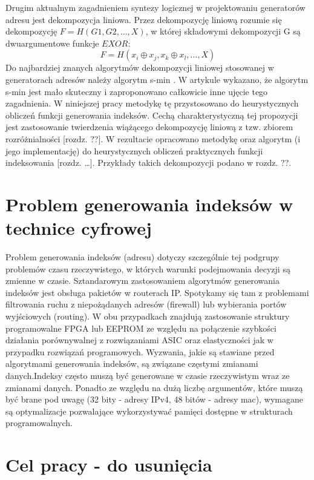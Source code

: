 Drugim aktualnym zagadnieniem syntezy logicznej w projektowaniu generatorów adresu jest dekompozycja liniowa.
Przez dekompozycję liniową rozumie się dekompozycję $F = H(G1, G2, ...,  X)$,
w której składowymi dekompozycji G są dwuargumentowe funkcje $EXOR$:
\begin{equation}
F = H (x_i \oplus x_j, x_k \oplus x_l, ..., X)
\end{equation}
Do najbardziej znanych algorytmów dekompozycji liniowej stosowanej w generatorach adresów należy algorytm s-min \cite{sasao-recent, sasao-s-min}.
W artykule \cite{redukcja-kompresja} wykazano, że algorytm s-min jest mało skuteczny i zaproponowano całkowicie inne ujęcie tego zagadnienia.
W niniejszej pracy metodykę tę przystosowano do heurystycznych obliczeń funkcji generowania indeksów.
Cechą charakterystyczną tej propozycji jest zastosowanie twierdzenia wiążącego dekompozycję liniową z tzw. zbiorem rozróżnialności [rozdz. ??].
W rezultacie opracowano metodykę oraz algorytm (i jego implementację) do heurystycznych obliczeń praktycznych funkcji indeksowania [rozdz. …].
Przykłady takich dekompozycji podano w rozdz. ??.

\section{Problem generowania indeksów w technice cyfrowej}

Problem generowania indeksów (adresu) dotyczy szczególnie tej podgrupy problemów czasu rzeczywistego,
w których warunki podejmowania decyzji są zmienne w czasie.
Sztandarowym zastosowaniem algorytmów generowania indeksów jest obsługa pakietów w routerach IP.
Spotykamy się tam z problemami filtrowania ruchu z niepożądanych adresów (firewall) lub wybierania portów wyjściowych (routing).
W obu przypadkach znajdują zastosowanie struktury programowalne FPGA lub EEPROM
ze względu na połączenie szybkości działania porównywalnej z rozwiązaniami ASIC oraz elastyczności jak w przypadku rozwiązań programowych.
Wyzwania,
jakie są stawiane przed algorytmami generowania indeksów,
są związane częstymi zmianami danych.Indeksy często muszą być generowane w czasie rzeczywistym wraz ze zmianami danych.
Ponadto ze względu na dużą liczbę argumentów,
które muszą być brane pod uwagę (32 bity - adresy IPv4, 48 bitów - adresy mac),
wymagane są optymalizacje pozwalające wykorzystywać pamięci dostępne w strukturach programowalnych.

\section{Cel pracy - do usunięcia}

